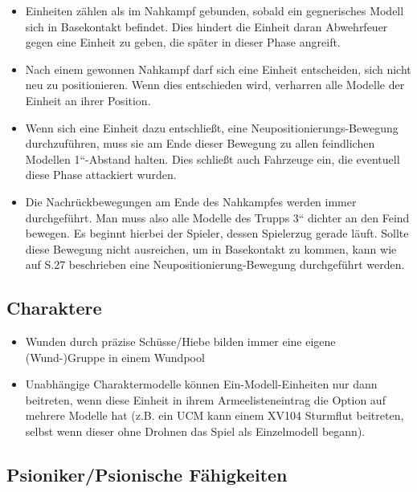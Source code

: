 \begin{itemize}
\item Einheiten zählen als im Nahkampf gebunden, sobald ein gegnerisches Modell
 sich in Basekontakt befindet. Dies hindert die Einheit daran Abwehrfeuer gegen
 eine Einheit zu geben, die später in dieser Phase angreift.

\item Nach einem gewonnen Nahkampf darf sich eine Einheit entscheiden, sich
 nicht neu zu positionieren. Wenn dies entschieden wird, verharren alle Modelle
 der Einheit an ihrer Position.

\item Wenn sich eine Einheit dazu entschließt, eine Neupositionierungs-Bewegung
 durchzuführen, muss sie am Ende dieser Bewegung zu allen feindlichen Modellen
 1“-Abstand halten. Dies schließt auch Fahrzeuge ein, die eventuell diese Phase
 attackiert wurden.

\item Die Nachrückbewegungen am Ende des Nahkampfes werden immer durchgeführt.
 Man muss also alle Modelle des Trupps 3“ dichter an den Feind bewegen. Es
 beginnt hierbei der Spieler, dessen Spielerzug gerade läuft.  Sollte diese
 Bewegung nicht ausreichen, um in Basekontakt zu kommen, kann wie auf S.27
 beschrieben eine Neupositionierung-Bewegung durchgeführt werden.

\end{itemize}

\subsection{Charaktere}

\begin{itemize}

 \item Wunden durch präzise Schüsse/Hiebe bilden immer eine eigene (Wund-)Gruppe
  in einem Wundpool

 \item Unabhängige Charaktermodelle können Ein-Modell-Einheiten nur dann
  beitreten, wenn diese Einheit in ihrem Armeelisteneintrag die Option auf
  mehrere Modelle hat (z.B. ein UCM kann einem XV104 Sturmflut beitreten,
  selbst wenn dieser ohne Drohnen das Spiel als Einzelmodell begann).

\end{itemize}

\subsection{Psioniker/Psionische Fähigkeiten}

